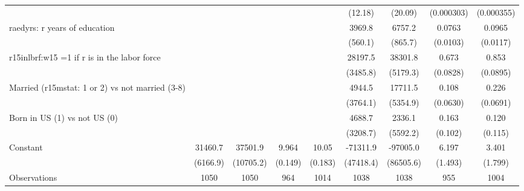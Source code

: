 \begin{table}[htbp]
\begin{tabular}{l*{8}{c}}
                &                  &                  &                  &                  &  (12.18)         &  (20.09)         &(0.000303)         &(0.000355)         \\
\addlinespace
raedyrs: r years of education&                  &                  &                  &                  &   3969.8\sym{***}&   6757.2\sym{***}&   0.0763\sym{***}&   0.0965\sym{***}\\
                &                  &                  &                  &                  &  (560.1)         &  (865.7)         & (0.0103)         & (0.0117)         \\
\addlinespace
r15inlbrf:w15 =1 if r is in the labor force&                  &                  &                  &                  &  28197.5\sym{***}&  38301.8\sym{***}&    0.673\sym{***}&    0.853\sym{***}\\
                &                  &                  &                  &                  & (3485.8)         & (5179.3)         & (0.0828)         & (0.0895)         \\
\addlinespace
Married (r15mstat: 1 or 2) vs not married (3-8)&                  &                  &                  &                  &   4944.5         &  17711.5\sym{***}&    0.108\sym{*}  &    0.226\sym{***}\\
                &                  &                  &                  &                  & (3764.1)         & (5354.9)         & (0.0630)         & (0.0691)         \\
\addlinespace
Born in US (1) vs not US (0)&                  &                  &                  &                  &   4688.7         &   2336.1         &    0.163         &    0.120         \\
                &                  &                  &                  &                  & (3208.7)         & (5592.2)         &  (0.102)         &  (0.115)         \\
\addlinespace
Constant        &  31460.7\sym{***}&  37501.9\sym{***}&    9.964\sym{***}&    10.05\sym{***}& -71311.9         & -97005.0         &    6.197\sym{***}&    3.401\sym{*}  \\
                & (6166.9)         &(10705.2)         &  (0.149)         &  (0.183)         &(47418.4)         &(86505.6)         &  (1.493)         &  (1.799)         \\
\midrule
Observations    &     1050         &     1050         &      964         &     1014         &     1038         &     1038         &      955         &     1004         \\

\end{tabular}
\end{table}
